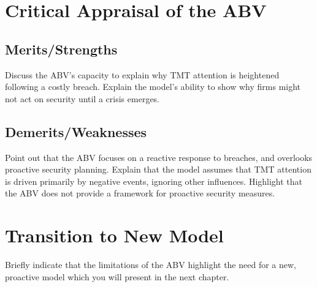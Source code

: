 \section{Critical Appraisal of the ABV}
\subsection{Merits/Strengths}
Discuss the ABV's capacity to explain why TMT attention is heightened following a costly breach. Explain the model's ability to show why firms might not act on security until a crisis emerges.
\subsection{Demerits/Weaknesses}
Point out that the ABV focuses on a reactive response to breaches, and overlooks proactive security planning. Explain that the model assumes that TMT attention is driven primarily by negative events, ignoring other influences. Highlight that the ABV does not provide a framework for proactive security measures.

\section{Transition to New Model}
Briefly indicate that the limitations of the ABV highlight the need for a new, proactive model which you will present in the next chapter.